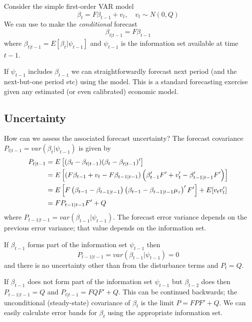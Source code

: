 \documentclass[
  letterpaper,
]{book}
\begin{document}
Consider the simple first-order VAR model \begin{equation}
  \beta_t = F\beta_{t-1}+v_{t},\quad v_t\sim N(0,Q)
\end{equation} We can use to make the \emph{conditional} forecast
\begin{equation}
  \beta_{t|t-1} = F\beta_{t-1}
\end{equation} where \(\beta_{t|t-1}=E[\beta_t|\psi_{t-1}]\) and
\(\psi_{t-1}\) is the information set available at time \(t-1\).

If \(\psi_{t-1}\) includes \(\beta_{t-1}\) we can straightforwardly
forecast next period (and the next-but-one period etc) using the model.
This is a standard forecasting exercise given any estimated (or even
calibrated) economic model.

\hypertarget{uncertainty}{%
\subsection{Uncertainty}\label{uncertainty}}

How can we assess the associated forecast uncertainty? The forecast
covariance \(P_{t|t-1} = var(\beta_t|\psi_{t-1})\) is given by
\begin{align}
P_{t|t-1} &= E\left[ (\beta_t - \beta_{t|t-1})(\beta_t-\beta_{t|t-1})'\right]   \\
  &= E\left[ (F\beta_{t-1}+v_t-F\beta_{t-1|t-1}) \left(\beta_{t-1}'F'+v_t'-\beta_{t-1|t-1}'F'\right) \right] \\
&= E\left[ F\left( \beta _{t-1}-\beta _{t-1|t-1}\right) \left( \beta_{t-1}-\beta _{t-1|t-1}\mu_z \right) ' F' \right] + E[v_t v_t']  \notag \\
&= FP_{t-1|t-1}F' + Q
\end{align} where \(P_{t-1|t-1} = var(\beta_{t-1}|\psi_{t-1})\). The
forecast error variance depends on the previous error variance; that
value depends on the information set.

If \(\beta_{t-1}\) forms part of the information set \(\psi_{t-1}\) then
\begin{equation}
 P_{t-1|t-1} = var \left(\beta_{t-1}|\psi_{t-1}\right) = 0
\end{equation} and there is no uncertainty other than from the
disturbance terms and \(P_t=Q\).

If \(\beta_{t-1}\) does not form part of the information set
\(\psi_{t-1}\) but \(\beta _{t-2}\) does then \(P_{t-1|t-1}=Q\) and
\(P_{t|t-1}=FQF'+Q\). This can be continued backwards; the unconditional
(steady-state) covariance of \(\beta_t\) is the limit \(P=FPF'+Q\). We
can easily calculate error bands for \(\beta_t\) using the appropriate
information set.
\end{document}

